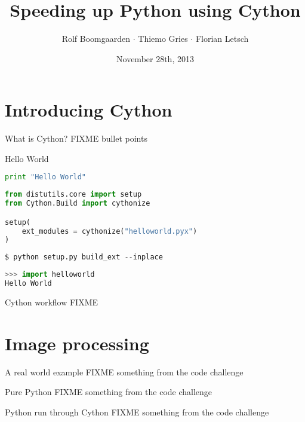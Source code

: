 \documentclass[dvipsnames]{beamer}
\title{Speeding up Python using Cython}
\author[Rolf $\cdot$ Thiemo $\cdot$ Flo]{Rolf Boomgaarden $\cdot$ Thiemo Gries $\cdot$ Florian Letsch}
\institute{Universität Hamburg}
\date{November 28th, 2013}
\begin{document}
\frame
{
\titlepage
}


\section{Introducing Cython}
\begin{frame}{What is Cython?}
FIXME bullet points
\end{frame}

\begin{frame}[fragile]{Hello World}
\begin{lstlisting}[language=Python]
print "Hello World"
\end{lstlisting}

\begin{lstlisting}[language=Python]
from distutils.core import setup
from Cython.Build import cythonize

setup(
    ext_modules = cythonize("helloworld.pyx")
)
\end{lstlisting}

\begin{lstlisting}[language=Python]
$ python setup.py build_ext --inplace
\end{lstlisting}

\begin{lstlisting}[language=Python]
>>> import helloworld
Hello World
\end{lstlisting}

\end{frame}

\begin{frame}{Cython workflow}
FIXME
\end{frame}


\section{Image processing}

\begin{frame}{A real world example}
FIXME something from the code challenge
\end{frame}

\begin{frame}{Pure Python}
FIXME something from the code challenge
\end{frame}

\begin{frame}{Python run through Cython}
FIXME something from the code challenge
\end{frame}
\end{document}
